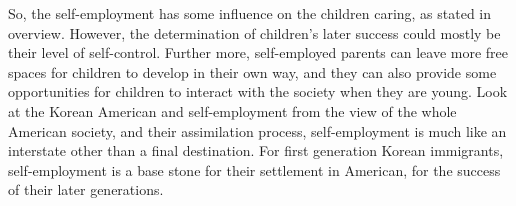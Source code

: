 So, the self-employment has some influence on the children caring, as stated in
overview. However, the determination of children's later success could mostly
be their level of self-control. Further more, self-employed parents can
leave more free spaces for children to develop in their own way, and they
can also provide some opportunities for children to interact with the
society when they are young. Look at the Korean American and self-employment
from the view of the whole American society, and their assimilation process, 
self-employment is much like an interstate other than a final destination.  For
first generation Korean immigrants, self-employment is a base stone for their 
settlement in American, for the success of their later generations.
